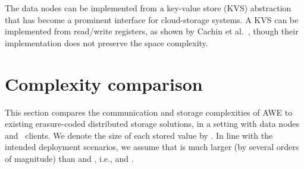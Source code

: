 \documentclass[oribibl]{llncs}
\theoremstyle{definition-boldhead}
\newcommand{\var}[1]{\textit{#1}}
\newcommand{\op}[1]{\textsl{#1}}
\newcommand{\dir}{\var{dir}\xspace}
\newcommand{\NAME}{AWE\xspace}
\newcommand{\node}{node\xspace}
\newcommand{\nodes}{nodes\xspace}
\providecommand{\note}[1]{}
\renewcommand{\note}[1]{[[\textsf{\bf #1}]]}
\begin{document}
The data \nodes can be implemented from a key-value store (KVS)
abstraction that has become a prominent interface for cloud-storage
systems.  A KVS can be implemented from read/write registers, as shown
by Cachin et al.~\cite{cajuso12}, though their implementation does
not preserve the space complexity.

\fi

\begin{comment}
\note{Readers may be Byzantine.}

In current formulation and the complexity analysis presented in
Section~\ref{} we implicitely assume that there are no Byzantine clients.
Clearly, given that a Byzantine writer could update \dir with timestamps that
do not correspond to values stored to data \nodes, readers could be
stalled from completing.
However, \NAME algorithms could resist such poisonous writer attacks with a
slight modification on the reader side. In particular, we could modify the
\var{highestread} operation such that it returns the highest  timestamps
from the timestamps returned from the \var{readfrom} invocations within.
Then the reader could issue read requests for the data fragments stored
in each data \node for all  values. Given that at most  entries
are false, the reader is guaranteed to reconstruct at least one value.
Clearly, such an extension would increase the communication overhead of
\op{Read} into  bits.

\note{The optimistic scheme of ORCAS~\cite{dugule08} can be an
  extension of this, if synchrony is assumed.  (ORCAS-A or -B??}

\note{In current formulation all data \nodes store the fragment, but
this is not needed; change d-WriteAck handler so that
additional parameter gcts denotes which data can be erased (all up
to and including gcts); for \nodes in wset, gcts=ts-1, for the
others gcts==ts, ie., they may erase the fragment again.}

\note{Address consistency amplification aspect.}
\note{Garbage collection could be disconnected from register-write operations.}

\end{comment}




\section{Complexity comparison}
\label{sec:complexity}

This section compares the communication and storage complexities of
\NAME to existing erasure-coded distributed storage solutions, in a
setting with  data \nodes and ~clients.  We denote the size of
each stored value  by .  In line with the intended deployment scenarios, we assume
that  is much larger (by several orders of magnitude) than 
and  , i.e.,  and .
\end{document}
